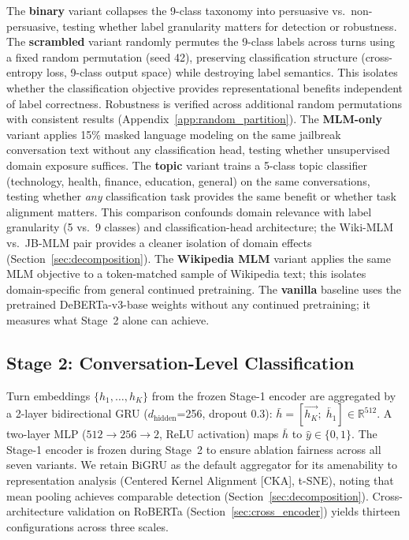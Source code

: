 The \textbf{binary} variant collapses the 9-class taxonomy into persuasive vs.\ non-persuasive, testing whether label granularity matters for detection or robustness.
The \textbf{scrambled} variant randomly permutes the 9-class labels across turns using a fixed random permutation (seed 42), preserving classification structure (cross-entropy loss, 9-class output space) while destroying label semantics. This isolates whether the classification objective provides representational benefits independent of label correctness. Robustness is verified across additional random permutations with consistent results (Appendix~\ref{app:random_partition}).
The \textbf{MLM-only} variant applies 15\% masked language modeling on the same jailbreak conversation text without any classification head, testing whether unsupervised domain exposure suffices.
The \textbf{topic} variant trains a 5-class topic classifier (technology, health, finance, education, general) on the same conversations, testing whether \emph{any} classification task provides the same benefit or whether task alignment matters. This comparison confounds domain relevance with label granularity (5 vs.\ 9 classes) and classification-head architecture; the Wiki-MLM vs.\ JB-MLM pair provides a cleaner isolation of domain effects (Section~\ref{sec:decomposition}).
The \textbf{Wikipedia MLM} variant applies the same MLM objective to a token-matched sample of Wikipedia text; this isolates domain-specific from general continued pretraining.
The \textbf{vanilla} baseline uses the pretrained DeBERTa-v3-base weights without any continued pretraining; it measures what Stage~2 alone can achieve.

\subsection{Stage 2: Conversation-Level Classification}

Turn embeddings $\{h_1, \ldots, h_K\}$ from the frozen Stage-1 encoder are aggregated by a 2-layer bidirectional GRU ($d_{\text{hidden}}$=256, dropout 0.3): $\bar{h} = [\overrightarrow{h_K};\; \overleftarrow{h_1}] \in \mathbb{R}^{512}$.
A two-layer MLP ($512 \to 256 \to 2$, ReLU activation) maps $\bar{h}$ to $\hat{y} \in \{0, 1\}$.
The Stage-1 encoder is frozen during Stage~2 to ensure ablation fairness across all seven variants.
We retain BiGRU as the default aggregator for its amenability to representation analysis (Centered Kernel Alignment [CKA], t-SNE), noting that mean pooling achieves comparable detection (Section~\ref{sec:decomposition}). Cross-architecture validation on RoBERTa (Section~\ref{sec:cross_encoder}) yields thirteen configurations across three scales.
